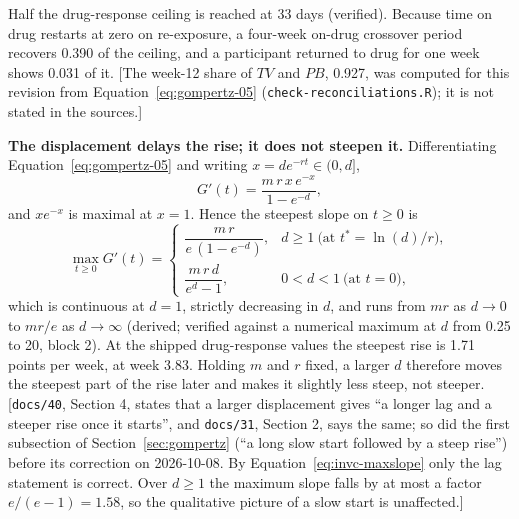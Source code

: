 \documentclass[11pt]{article}
\newcommand{\note}[1]{\textcolor{blue!60!black}{\small [#1]}}
\newcommand{\code}[1]{\texttt{#1}}
\begin{document}
\noindent Half the drug-response ceiling is reached at 33 days
(verified). Because time on drug restarts at zero on re-exposure, a
four-week on-drug crossover period recovers 0.390 of the ceiling, and
a participant returned to drug for one week shows 0.031 of it.
\note{The week-12 share of $TV$ and $PB$, 0.927, was computed for this
revision from Equation~\eqref{eq:gompertz-05}
(\code{check-reconciliations.R}); it is not stated in the sources.}

\textbf{The displacement delays the rise; it does not steepen it.}
Differentiating Equation~\eqref{eq:gompertz-05} and writing
$x = d e^{-rt} \in (0, d]$,
\[
G'(t) = \frac{m\, r\, x\, e^{-x}}{1 - e^{-d}},
\]
and $x e^{-x}$ is maximal at $x = 1$. Hence the steepest slope on
$t \ge 0$ is
\begin{equation}
\max_{t \ge 0} G'(t) =
\begin{cases}
  \dfrac{m\, r}{e\,(1 - e^{-d})}, & d \ge 1 \ \text{(at } t^\ast = \ln(d)/r), \\[8pt]
  \dfrac{m\, r\, d}{e^{d} - 1}, & 0 < d < 1 \ \text{(at } t = 0),
\end{cases}
\label{eq:invc-maxslope}
\end{equation}
which is continuous at $d = 1$, strictly decreasing in $d$, and runs
from $m r$ as $d \to 0$ to $m r/e$ as $d \to \infty$ (derived; verified
against a numerical maximum at $d$ from 0.25 to 20, block 2). At the
shipped drug-response values the steepest rise is 1.71 points per week,
at week 3.83. Holding $m$ and $r$ fixed, a larger $d$ therefore moves
the steepest part of the rise later and makes it slightly less steep,
not steeper. \note{\code{docs/40}, Section 4, states that a larger
displacement gives ``a longer lag and a steeper rise once it starts'',
and \code{docs/31}, Section 2, says the same; so did the first
subsection of Section~\ref{sec:gompertz} (``a long slow start followed
by a steep rise'') before its correction on 2026-10-08. By
Equation~\eqref{eq:invc-maxslope} only the lag statement is correct.
Over $d \ge 1$ the maximum slope falls by at most a factor
$e/(e-1) = 1.58$, so the qualitative picture of a slow start is
unaffected.}
\end{document}
